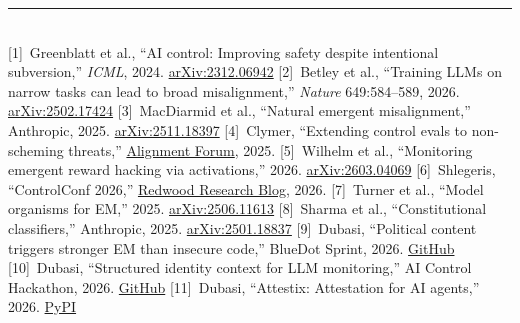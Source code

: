 \documentclass[10pt,a4paper,twocolumn]{article}
\begin{document}
\noindent\rule{\columnwidth}{0.3pt}\\[1.5pt]
{\fontsize{6.5}{7.8}\selectfont\noindent
\hypertarget{ref1}{[1]}~Greenblatt et al., ``AI control: Improving safety despite intentional subversion,'' \textit{ICML}, 2024. \href{https://arxiv.org/abs/2312.06942}{arXiv:2312.06942}\enspace
\hypertarget{ref2}{[2]}~Betley et al., ``Training LLMs on narrow tasks can lead to broad misalignment,'' \textit{Nature} 649:584--589, 2026. \href{https://arxiv.org/abs/2502.17424}{arXiv:2502.17424}\enspace
\hypertarget{ref3}{[3]}~MacDiarmid et al., ``Natural emergent misalignment,'' Anthropic, 2025. \href{https://arxiv.org/abs/2511.18397}{arXiv:2511.18397}\enspace
\hypertarget{ref4}{[4]}~Clymer, ``Extending control evals to non-scheming threats,'' \href{https://www.alignmentforum.org/posts/ArK2YhmpTy8XftubN}{Alignment Forum}, 2025.\enspace
\hypertarget{ref5}{[5]}~Wilhelm et al., ``Monitoring emergent reward hacking via activations,'' 2026. \href{https://arxiv.org/abs/2603.04069}{arXiv:2603.04069}\enspace
\hypertarget{ref6}{[6]}~Shlegeris, ``ControlConf 2026,'' \href{https://blog.redwoodresearch.org/p/announcing-controlconf-2026}{Redwood Research Blog}, 2026.\enspace
\hypertarget{ref7}{[7]}~Turner et al., ``Model organisms for EM,'' 2025. \href{https://arxiv.org/abs/2506.11613}{arXiv:2506.11613}\enspace
\hypertarget{ref8}{[8]}~Sharma et al., ``Constitutional classifiers,'' Anthropic, 2025. \href{https://arxiv.org/abs/2501.18837}{arXiv:2501.18837}\enspace
\hypertarget{ref9}{[9]}~Dubasi, ``Political content triggers stronger EM than insecure code,'' BlueDot Sprint, 2026. \href{https://github.com/ascender1729/emergent-misalignment-political}{GitHub}\enspace
\hypertarget{ref10}{[10]}~Dubasi, ``Structured identity context for LLM monitoring,'' AI Control Hackathon, 2026. \href{https://github.com/ascender1729/identity-control-arena}{GitHub}\enspace
\hypertarget{ref11}{[11]}~Dubasi, ``Attestix: Attestation for AI agents,'' 2026. \href{https://pypi.org/project/attestix/}{PyPI}}
\end{document}
